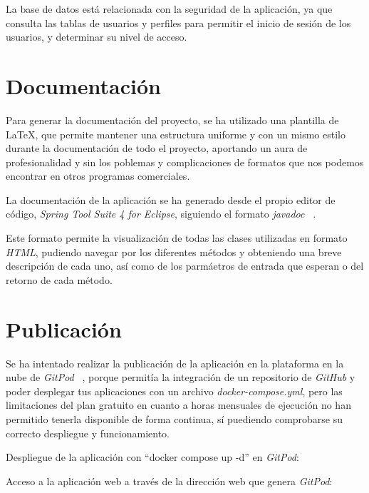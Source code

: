 La base de datos está relacionada con la seguridad de la aplicación, ya que consulta las tablas de usuarios y perfiles para permitir el inicio de sesión de los usuarios, y determinar su nivel de acceso.

\section{Documentación}

Para generar la documentación del proyecto, se ha utilizado una plantilla de \LaTeX, que permite mantener una estructura uniforme y con un mismo estilo durante la documentación de todo el proyecto, aportando un aura de profesionalidad y sin los poblemas y complicaciones de formatos que nos podemos encontrar en otros programas comerciales.

La documentación de la aplicación se ha generado desde el propio editor de código, \textit{Spring Tool Suite 4 for Eclipse}, siguiendo el formato \textit{javadoc} ~\cite{doc:javadoc}.

Este formato permite la visualización de todas las clases utilizadas en formato \textit{HTML}, pudiendo navegar por los diferentes métodos y obteniendo una breve descripción de cada uno, así como de los parmáetros de entrada que esperan o del retorno de cada método.
\clearpage
\section{Publicación}

Se ha intentado realizar la publicación de la aplicación en la plataforma en la nube de \textit{GitPod} ~\cite{doc:gitpod}, porque permitía la integración de un repositorio de \textit{GitHub} y poder desplegar tus aplicaciones con un archivo \textit{docker-compose.yml}, pero las limitaciones del plan gratuito en cuanto a horas mensuales de ejecución no han permitido tenerla disponible de forma continua, sí puediendo comprobarse su correcto despliegue y funcionamiento.

Despliegue de la aplicación con ``docker compose up -d'' en \textit{GitPod}:

Acceso a la aplicación web a través de la dirección web que genera \textit{GitPod}:




